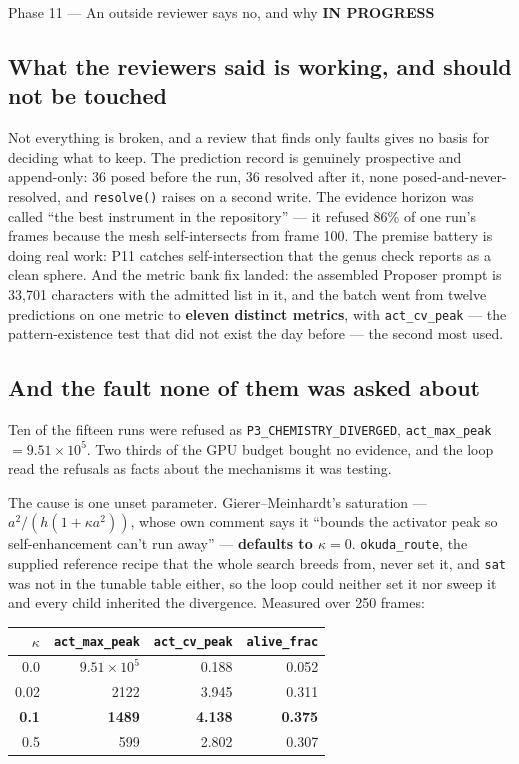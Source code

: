 \documentclass[11pt,a4paper]{article}
\newcommand{\code}[1]{\texttt{#1}}
\newcommand{\prog}{\textcolor{warn}{\textbf{IN PROGRESS}}}
\begin{document}
\begin{phasebox}{Phase 11 --- An outside reviewer says no, and why \hfill \prog}
\subsection*{What the reviewers said is working, and should not be touched}
Not everything is broken, and a review that finds only faults gives no basis for deciding what to
keep. The prediction record is genuinely prospective and append-only: 36 posed before the run, 36
resolved after it, none posed-and-never-resolved, and \code{resolve()} raises on a second write.
The evidence horizon was called ``the best instrument in the repository'' --- it refused 86\% of
one run's frames because the mesh self-intersects from frame 100. The premise battery is doing real
work: P11 catches self-intersection that the genus check reports as a clean sphere. And the metric
bank fix landed: the assembled Proposer prompt is 33,701 characters with the admitted list in it,
and the batch went from twelve predictions on one metric to \textbf{eleven distinct metrics}, with
\code{act\_cv\_peak} --- the pattern-existence test that did not exist the day before --- the
second most used.

\subsection*{And the fault none of them was asked about}
Ten of the fifteen runs were refused as \code{P3\_CHEMISTRY\_DIVERGED}, \code{act\_max\_peak}
$=9.51\times10^{5}$. Two thirds of the GPU budget bought no evidence, and the loop read the
refusals as facts about the mechanisms it was testing.

The cause is one unset parameter. Gierer--Meinhardt's saturation --- $a^2/(h(1+\kappa a^2))$,
whose own comment says it ``bounds the activator peak so self-enhancement can't run away'' ---
\textbf{defaults to $\kappa = 0$}. \code{okuda\_route}, the supplied reference recipe that the
whole search breeds from, never set it, and \code{sat} was not in the tunable table either, so the
loop could neither set it nor sweep it and every child inherited the divergence. Measured over 250
frames:

\begin{center}\small
\begin{tabular}{@{}rrrr@{}}
\toprule
$\kappa$ & \code{act\_max\_peak} & \code{act\_cv\_peak} & \code{alive\_frac} \\
\midrule
0.0  & $9.51\times10^{5}$ & 0.188 & 0.052 \\
0.02 & 2122 & 3.945 & 0.311 \\
\textbf{0.1} & \textbf{1489} & \textbf{4.138} & \textbf{0.375} \\
0.5  & 599 & 2.802 & 0.307 \\
\bottomrule
\end{tabular}
\end{center}


\end{phasebox}
\end{document}
